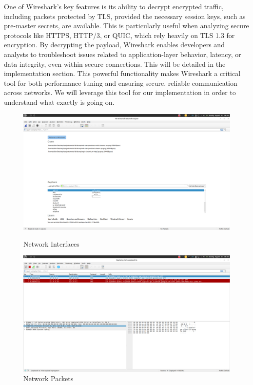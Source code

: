 One of Wireshark’s key features is its ability to decrypt encrypted traffic, including packets protected by TLS, provided the necessary session keys, such as pre-master secrets, are available. This is particularly useful when analyzing secure protocols like HTTPS, HTTP/3, or QUIC, which rely heavily on TLS 1.3 for encryption. By decrypting the payload, Wireshark enables developers and analysts to troubleshoot issues related to application-layer behavior, latency, or data integrity, even within secure connections. This will be detailed in the implementation section. This powerful functionality makes Wireshark a critical tool for both performance tuning and ensuring secure, reliable communication across networks. We will leverage this tool for our implementation in order to understand what exactly is going on.


\begin{figure}[H]
\centering
\begin{minipage}{0.9\textwidth}
  \centering
  \includegraphics[width=\textwidth]{SOA/ws_interfaces.png}
  \caption{Network Interfaces}
  \label{fig:ws_interfaces} %
\end{minipage}
\hfill
\begin{minipage}{0.9\textwidth}
  \centering
  \includegraphics[width=\textwidth]{SOA/ws_packets.png}
  \caption{Network Packets}
  \label{fig:ws_packets} %
\end{minipage}
\end{figure}

